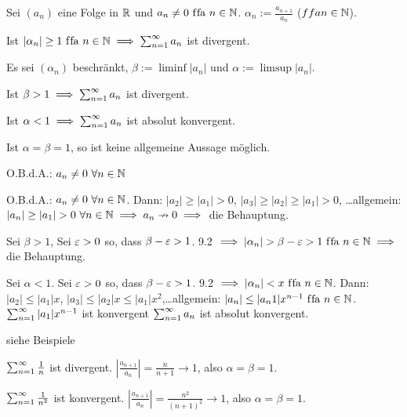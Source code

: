\documentclass[a4paper,twoside,DIV15,BCOR12mm]{scrbook}
\begin{document}
\begin{satz}[Quotientenkriterium]

Sei $(a_n)$ eine Folge in $\mathbb{R}$ und $a_n \ne 0 \text{ f\/fa } n\in\mathbb{N}$. $\alpha_n := \frac{a_{n+1}}{a_n}$ ($ffa n\in\mathbb{N}$).
\begin{liste}
\item Ist $|\alpha_n| \ge 1 \text{ f\/fa }n\in\mathbb{N} \implies \sum_{n=1}^{\infty}{a_n}$ ist divergent.
\item Es sei $(\alpha_n)$ beschränkt, $\beta := \liminf |a_n|$ und $\alpha := \limsup |a_n|$.
\begin{liste}
\item Ist $\beta > 1 \implies \sum_{n=1}^{\infty}{a_n}$ ist divergent.
\item Ist $\alpha < 1 \implies \sum_{n=1}^{\infty}{a_n}$ ist absolut konvergent.
\item Ist $\alpha = \beta = 1$, so ist keine allgemeine Aussage möglich.
\end{liste}
\end{liste}
\end{satz}

\begin{beweis}
O.B.d.A.: $a_n \ne 0 \ \forall\natn$
\begin{liste}
\item O.B.d.A.: $a_n \ne 0 \ \forall\natn$. Dann: $|a_2|\ge |a_1|>0$, $|a_3|\ge|a_2|\ge|a_1|>0$, \ldots allgemein: $|a_n|\ge|a_1|>0\ \forall\natn \folgt a_n\nrightarrow 0 \folgt$ die Behauptung.
\item 
\begin{liste}
\item Sei $\beta >1$, Sei $\varepsilon>0$ so, dass $\beta-\varepsilon>1$. 9.2 $\folgt |\alpha_n|>\beta-\ep>1 \ffa n\in\MdN \folgt$ die Behauptung.
\item Sei $\alpha < 1$. Sei $\varepsilon>0$ so, dass $\beta-\varepsilon>1$. 9.2 $\implies |\alpha_n|< x \text{ f\/fa }n\in\mathbb{N}$. Dann: $|a_2|\le|a_1|x$, $|a_3|\le|a_2|x\le|a_1|x^2$,\ldots allgemein: $|a_n|\le|a_n1|x^{n-1} \text{ f\/fa }n\in\mathbb{N}$. $\sum_{n=1}^{\infty}{|a_1|x^{n-1}}$ ist konvergent  $\sum_{n=1}^{\infty}{a_n}$ ist absolut konvergent.
\item siehe Beispiele
\end{liste}
\end{liste}
\end{beweis}

\begin{beispiele}
\item $\sum_{n=1}^{\infty}{\frac{1}{n}}$ ist divergent. $\left|\frac{a_{n+1}}{a_n}\right| = \frac{n}{n+1} \to 1$, also $\alpha = \beta = 1$.
\item $\sum_{n=1}^{\infty}{\frac{1}{n^2}}$ ist konvergent. $\left|\frac{a_{n+1}}{a_n}\right| = \frac{n^2}{(n+1)^2} \to 1$, also $\alpha = \beta = 1$.
\end{beispiele}
\end{document}
